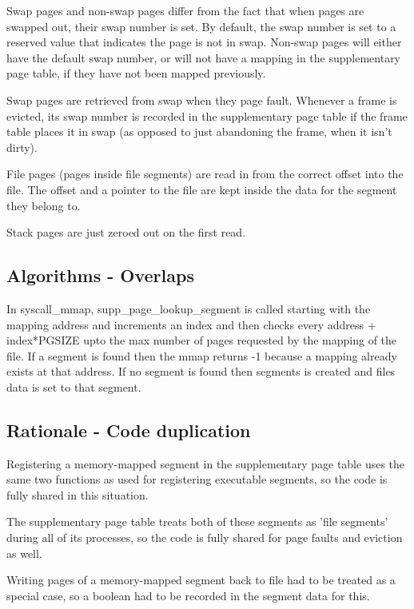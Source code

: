 Swap pages and non-swap pages differ from the fact that when pages are swapped
out, their swap number is set. By default, the swap number is set to a reserved
value that indicates the page is not in swap. Non-swap pages will either have
the default swap number, or will not have a mapping in the supplementary page
table, if they have not been mapped previously.

Swap pages are retrieved from swap when they page fault. Whenever a frame is
evicted, its swap number is recorded in the supplementary page table if the
frame table places it in swap (as opposed to just abandoning the frame, when it
isn't dirty).

File pages (pages inside file segments) are read in from the correct offset into
the file. The offset and a pointer to the file are kept inside the data for the
segment they belong to.

Stack pages are just zeroed out on the first read.

\subsection{Algorithms - Overlaps}


In syscall\_mmap, supp\_page\_lookup\_segment is called starting with the mapping address and increments an index and then checks every address + index*PGSIZE upto the max number of pages requested by the mapping of the file. If a segment is found then the mmap returns -1 because a mapping already exists at that address. If no segment is found then segments is created and files data is set to that segment.

\subsection{Rationale - Code duplication}


Registering a memory-mapped segment in the supplementary page table uses the
same two functions as used for registering executable segments, so the code is
fully shared in this situation.

The supplementary page table treats both of these segments as 'file segments'
during all of its processes, so the code is fully shared for page faults and
eviction as well.

Writing pages of a memory-mapped segment back to file had to be treated as a
special case, so a boolean had to be recorded in the segment data for this.
